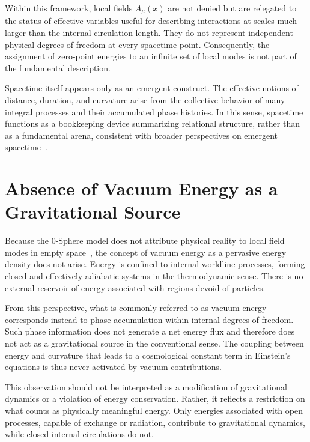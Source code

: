 \documentclass[%
 reprint,
 amsmath,amssymb,
 aps,
 prb,
]{revtex4-2}
\numberwithin{equation}{section}
\begin{document}
Within this framework, local fields $A_\mu(x)$ are not denied but are relegated to the status of effective variables useful for describing interactions at scales much larger than the internal circulation length. They do not represent independent physical degrees of freedom at every spacetime point. Consequently, the assignment of zero-point energies to an infinite set of local modes is not part of the fundamental description.

Spacetime itself appears only as an emergent construct. The effective notions of distance, duration, and curvature arise from the collective behavior of many integral processes and their accumulated phase histories. In this sense, spacetime functions as a bookkeeping device summarizing relational structure, rather than as a fundamental arena, consistent with broader perspectives on emergent spacetime~\cite{Jacobson1995,Rovelli1997,Padmanabhan2010}.

\section{Absence of Vacuum Energy as a Gravitational Source}
\label{sec:absence_vacuum}

Because the 0-Sphere model does not attribute physical reality to local field modes in empty space~\cite{Hanamura17765017}, the concept of vacuum energy as a pervasive energy density does not arise. Energy is confined to internal worldline processes, forming closed and effectively adiabatic systems in the thermodynamic sense. There is no external reservoir of energy associated with regions devoid of particles.

From this perspective, what is commonly referred to as vacuum energy corresponds instead to phase accumulation within internal degrees of freedom. Such phase information does not generate a net energy flux and therefore does not act as a gravitational source in the conventional sense. The coupling between energy and curvature that leads to a cosmological constant term in Einstein's equations is thus never activated by vacuum contributions.

This observation should not be interpreted as a modification of gravitational dynamics or a violation of energy conservation. Rather, it reflects a restriction on what counts as physically meaningful energy. Only energies associated with open processes, capable of exchange or radiation, contribute to gravitational dynamics, while closed internal circulations do not.
\end{document}
